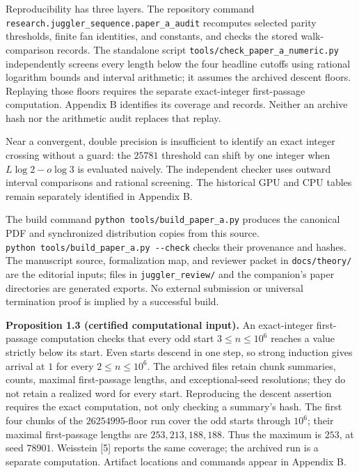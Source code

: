 \documentclass[12pt]{article}
\begin{document}
Reproducibility has three layers. The repository command
\texttt{\nolinkurl{research.juggler_sequence.paper_a_audit}} recomputes
selected parity thresholds, finite fan identities, and constants, and
checks the stored walk-comparison records. The standalone script
\texttt{\nolinkurl{tools/check_paper_a_numeric.py}} independently
screens every length below the four headline cutoffs using rational
logarithm bounds and interval arithmetic; it assumes the archived
descent floors. Replaying those floors requires the separate
exact-integer first-passage computation. Appendix B identifies its
coverage and records. Neither an archive hash nor the arithmetic audit
replaces that replay.

Near a convergent, double precision is insufficient to identify an exact
integer crossing without a guard: the \(25781\) threshold can shift by
one integer when \(L\log2-o\log3\) is evaluated naively. The independent
checker uses outward interval comparisons and rational screening. The
historical GPU and CPU tables remain separately identified in Appendix
B.

The build command \texttt{python\ tools/build\_paper\_a.py} produces the
canonical PDF and synchronized distribution copies from this source.
\texttt{python\ tools/build\_paper\_a.py\ -\/-check} checks their
provenance and hashes. The manuscript source, formalization map, and
reviewer packet in \texttt{\nolinkurl{docs/theory/}} are the editorial
inputs; files in \texttt{\nolinkurl{juggler_review/}} and the
companion's paper directories are generated exports. No external
submission or universal termination proof is implied by a successful
build.

\textbf{Proposition 1.3 (certified computational input).} An
exact-integer first-passage computation checks that every odd start
\(3\le n\le10^6\) reaches a value strictly below its start. Even starts
descend in one step, so strong induction gives arrival at \(1\) for
every \(2\le n\le10^6\). The archived files retain chunk summaries,
counts, maximal first-passage lengths, and exceptional-seed resolutions;
they do not retain a realized word for every start. Reproducing the
descent assertion requires the exact computation, not only checking a
summary's hash. The first four chunks of the \(26254995\)-floor run
cover the odd starts through \(10^6\); their maximal first-passage
lengths are \(253,213,188,188\). Thus the maximum is \(253\), at seed
\(78901\). Weisstein {[}5{]} reports the same coverage; the archived run
is a separate computation. Artifact locations and commands appear in
Appendix B.
\end{document}
